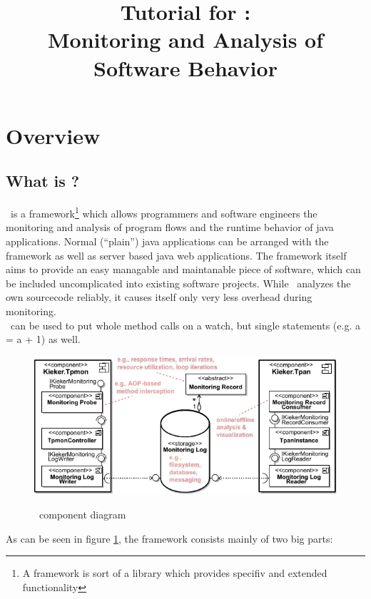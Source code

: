 \documentclass[a4paper, oneside, 11pt]{scrartcl}
\title{Tutorial for \Kieker:\\ Monitoring and Analysis of Software Behavior}
\begin{document}
\maketitle
\tableofcontents

\newpage

\section{Overview}
\subsection{What is \Kieker?}
\Kieker\ is a framework\footnote{A framework is sort of a library which provides specifiv and extended functionality} which allows programmers and software engineers the monitoring and analysis of program flows and the runtime behavior of java applications. Normal (``plain'') java applications can be arranged with the framework as well as server based java web applications. The framework itself aims to provide an easy managable and maintanable piece of software, which can be included uncomplicated into existing software projects. While \Kieker\ analyzes the own sourcecode reliably, it causes itself only very less overhead during monitoring.\\
\Kieker\ can be used to put whole method calls on a watch, but single statements (e.g. a = a + 1) as well.
\begin{figure}[H]
	\begin{center}
		\includegraphics[width=1.0\textwidth]{kiekerComponentDiagram.pdf}
		\label{image:componentdiagram}
		\caption{\Kieker\ component diagram}
	\end{center}
\end{figure}
As can be seen in figure \ref{image:componentdiagram}, the framework consists mainly of two big parts:
\end{document}
